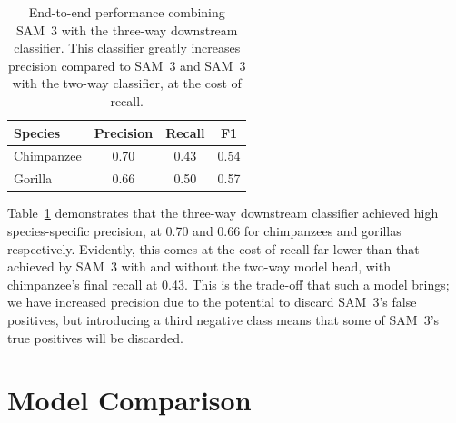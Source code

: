 \documentclass[author={Jacob Stephenson},
    degree={BSc},
    title={Robust Great Ape Species Detection in Wild Camera Trap Imagery with Promptable Concept Segmentation},
    unit={COMS30045},
    subtitle={}]{dissertation}
\begin{document}
\begin{table}[H]
    \centering

    \begin{tabular}{l|ccc}
        \toprule
        \textbf{Species} & \textbf{Precision} & \textbf{Recall} & \textbf{F1} \\
        \midrule
        Chimpanzee & 0.70 & 0.43 & 0.54 \\
        Gorilla & 0.66 & 0.50 & 0.57 \\
        \bottomrule
    \end{tabular}

    \caption[SAM 3 + Three-Way Classifier Performance]{End-to-end performance combining SAM~3 with the three-way downstream classifier. This classifier greatly increases precision compared to SAM~3 and SAM~3 with the two-way classifier, at the cost of recall.}
    \label{tab:eteperformance3}
\end{table}


Table~\ref{tab:eteperformance3} demonstrates that the three-way downstream classifier achieved high species-specific precision, at 0.70 and 0.66 for chimpanzees and gorillas respectively. Evidently, this comes at the cost of recall far lower than that achieved by SAM~3 with and without the two-way model head, with chimpanzee's final recall at 0.43. This is the trade-off that such a model brings; we have increased precision due to the potential to discard SAM~3's false positives, but introducing a third negative class means that some of SAM~3's true positives will be discarded.


\section{Model Comparison}
\end{document}
